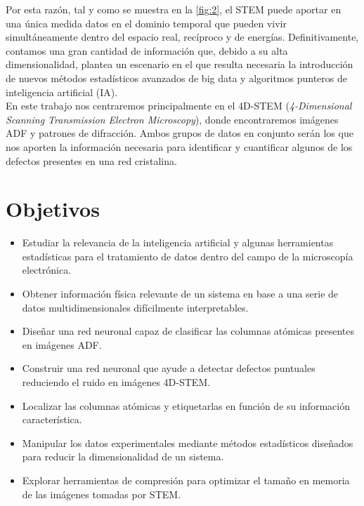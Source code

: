 \newpage
Por esta razón, tal y como se muestra en la \autoref{fig:2}, el STEM puede aportar en una única medida datos en el dominio temporal que pueden vivir simultáneamente dentro del espacio real, recíproco y de energías. Definitivamente, contamos una gran cantidad de información que, debido a su alta dimensionalidad, plantea un escenario en el que resulta necesaria la introducción de nuevos métodos estadísticos avanzados de big data y algoritmos punteros de inteligencia artificial (IA).\\


En este trabajo nos centraremos principalmente en el 4D-STEM (\textit{4-Dimensional Scanning Transmission Electron Microscopy}), donde encontraremos imágenes ADF y patrones de difracción. Ambos grupos de datos en conjunto serán los que nos aporten la información necesaria para identificar y cuantificar algunos de los defectos presentes en una red cristalina.\\

\section*{Objetivos}
 \normalsize

\begin{itemize}
    \item Estudiar la relevancia de la inteligencia artificial y algunas herramientas estadísticas para el tratamiento de datos dentro del campo de la microscopía electrónica. %
    
    \item Obtener información física relevante de un sistema en base a una serie de datos multidimensionales difícilmente interpretables. %
    
    \item Diseñar una red neuronal capaz de clasificar las columnas atómicas presentes en imágenes ADF. %
    
    \item Construir una red neuronal que ayude a detectar defectos puntuales reduciendo el ruido en imágenes 4D-STEM. %
    
    \item Localizar las columnas atómicas y etiquetarlas en función de su información característica. %
    
    \item Manipular los datos experimentales mediante métodos estadísticos diseñados para reducir la dimensionalidad de un sistema. %
    
    \item Explorar herramientas de compresión para optimizar el tamaño en memoria de las imágenes tomadas por STEM. %
\end{itemize}